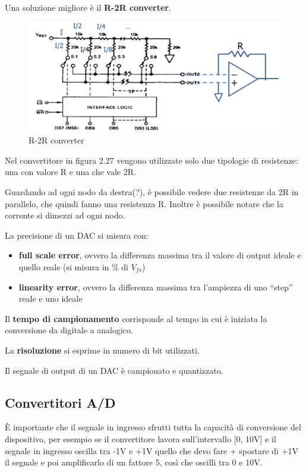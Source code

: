 \documentclass[
]{book}
\providecommand{\tightlist}{%
  \setlength{\itemsep}{0pt}\setlength{\parskip}{0pt}}
\begin{document}
Una soluzione migliore è il \textbf{R-2R converter}.

\begin{figure}
\centering
\includegraphics[width=0.5\linewidth,height=\textheight,keepaspectratio]{immagini/42.png}
\caption{R-2R converter}
\end{figure}

Nel convertitore in figura 2.27 vengono utilizzate solo due tipologie di
resistenze: una con valore R e una che vale 2R.

Guardando ad ogni nodo da destra(?), è possibile vedere due resistenze
da 2R in parallelo, che quindi fanno una resistenza R. Inoltre è
possibile notare che la corrente si dimezzi ad ogni nodo.

La precisione di un DAC si misura con:

\begin{itemize}
\tightlist
\item
  \textbf{full scale error}, ovvero la differenza massima tra il valore
  di output ideale e quello reale (si misura in \% di \(V_{fs}\))
\item
  \textbf{linearity error}, ovvero la differenza massima tra l'ampiezza
  di uno ``step'' reale e uno ideale
\end{itemize}

Il \textbf{tempo di campionamento} corrisponde al tempo in cui è
iniziata la conversione da digitale a analogico.

La \textbf{risoluzione} si esprime in numero di bit utilizzati.

Il segnale di output di un DAC è campionato e quantizzato.

\subsection{Convertitori A/D}\label{convertitori-ad}

È importante che il segnale in ingresso sfrutti tutta la capacità di
conversione del dispositivo, per esempio se il convertitore lavora
sull'intervallo {[}0, 10V{]} e il segnale in ingresso oscilla tra -1V e
+1V quello che devo fare + spostare di +1V il segnale e poi amplificarlo
di un fattore 5, così che oscilli tra 0 e 10V.
\end{document}
